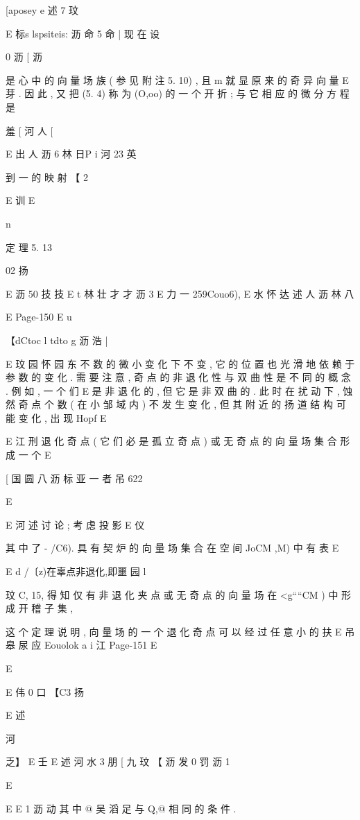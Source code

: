{{{{{{{{{{[aposey e 述
7 玟

E 标s lspsiteis: 沥 命 5 命 |
现 在 设

0 沥 [ 沥

是 心 中 的 向 量 场 族 ( 参 见 附 注 5. 10) , 且 m 就 显 原 来 的 奇 异 向 量
E 芽 . 因 此 , 又 把 (5. 4) 称 为 (O,oo) 的 一 个
开 折 ; 与 它 相 应 的 微 分 方 程 是

羞 [ 河 人 [

E 出 人 沥 6 林 日P i 河 23 英

到 一 的 映 射
【 2

E 训
E

n

定 理 5. 13

02 扬

E 沥 50 技 技
E t 林 壮 才 才 沥 3
E
力 一 259Couo6),
E 水 怀 达 述 人 沥 林 八

E
Page-150
E u

【dCtoc l tdto g 沥 浩 |

E 玟 园 怀 园 东 不
数 的 微 小 变 化 下 不 变 , 它 的 位 置 也 光 滑 地 依 赖 于 参 数 的 变 化 . 需
要 注 意 , 奇 点 的 非 退 化 性 与 双 曲 性 是 不 同 的 概 念 . 例 如 , 一 个 们
E
是 非 退 化 的 , 但 它 是 非 双 曲 的 . 此 时 在 扰 动 下 , 蚀 然 奇 点 个 数 ( 在
小 邹 域 内 ) 不 发 生 变 化 , 但 其 附 近 的 扬 道 结 构 可 能 变 化 , 出 现 Hopf
E

E 江 刑
退 化 奇 点 ( 它 们 必 是 孤 立 奇 点 ) 或 无 奇 点 的 向 量 场 集 合 形 成 一 个
E

[ 国 圆 八 沥 标 亚 一 者 吊 622

E

E 河 述
讨 论 ; 考 虑 投 影
E 仪

其 中 了 - /C6). 具 有 契 炉 的 向 量 场 集 合 在 空 间 JoCM ,M) 中 有 表
E

E
d
/〔z)在辜点非退化,即噩 园 l

玟
C, 15, 得 知 仅 有 非 退 化 夹 点 或 无 奇 点 的 向 量 场 在 <g““CM ) 中 形 成
开 稽 子 集 ,

这 个 定 理 说 明 , 向 量 场 的 一 个 退 化 奇 点 可 以 经 过 任 意 小 的 扶
E 吊 皋 尿 应
Eouolok a i 江
Page-151
E

E

E 伟 0 口
【C3 扬

E 述

河

乏】 E
壬 E 述 河 水 3 朋
[ 九
玟
【 沥 发 0 罚 沥 1

E
{ E E
1 沥 动
其 中 @ 吴 滔 足 与 Q,@ 相 同 的 条 件 .

}}}}}}}}}}}
